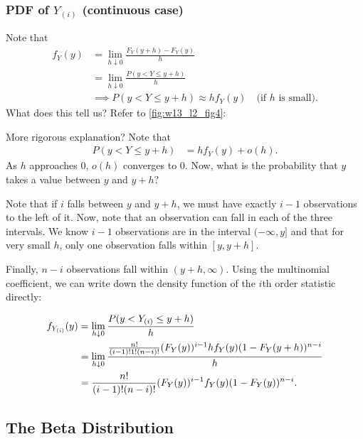\subsubsection{\texorpdfstring{PDF of $Y_{(i)}$ (continuous case)}{PDF of an order statistic (continuous case)}}
Note that
\begin{align*}
    f_Y(y)&=\lim_{h\downarrow 0}\frac{F_Y(y+h)-F_Y(y)}{h} \\
    &=\lim_{h\downarrow 0}\frac{P(y<Y\leq y+h)}{h}\\
    &\implies P(y<Y\leq y+h)\approx hf_Y(y) \quad \text{(if $h$ is small)}.
\end{align*}
What does this tell us? Refer to \autoref{fig:w13_l2_fig4}:

More rigorous explanation? Note that
\begin{align*}
    P(y<Y\leq y+h) &= hf_Y(y)+o(h).
\end{align*}
As $h$ approaches 0, $o(h)$ converges to 0. Now, what is the probability that $y$ takes a value between $y$ and $y+h?$ 


Note that if $i$ falls between $y$ and $y+h$, we must have exactly $i-1$ observations to the left of it. Now, note that an observation can fall in each of the three intervals. We know $i-1$ observations are in the interval $(-\infty, y]$ and that for very small $h$, only one observation falls within $[y,y+h]$.

Finally, $n-i$ observations fall within $(y+h,\infty)$. Using the multinomial coefficient, we can write down the density function of the $i$th order statistic directly:

\begin{align*}
    f_{Y_{(i)}}(y)&=\lim_{h\downarrow 0}\frac{P(y<{Y_{(i)}}\leq y+h)}{h} \\
    &=\lim_{h\downarrow 0}\frac{\frac{n!}{(i-1)!1!(n-i)!}(F_Y(y))^{i-1}hf_Y(y)(1-F_Y(y+h))^{n-i}}{h} \\
    &=\frac{n!}{(i-1)!(n-i)!}(F_Y(y))^{i-1}f_Y(y)(1-F_Y(y))^{n-i}.
\end{align*}

\subsection{The Beta Distribution}

